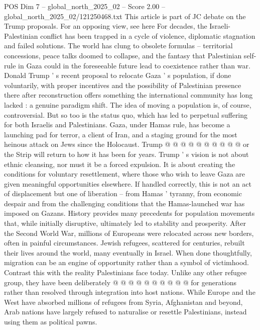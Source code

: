 \begin{textsample}{POS Dim 7 – global\_north\_2025\_02 – Score 2.00 – global\_north\_2025\_02/121250468.txt}  \label{ex:f7_pos_385}
This article is part of JC debate on the Trump proposals.
For an opposing view, see here For decades, the Israeli-Palestinian conflict has been trapped in a cycle of violence, diplomatic stagnation and failed solutions.
The world has clung to obsolete formulas -- territorial concessions, peace talks doomed to collapse, and the fantasy that Palestinian self-rule in Gaza could in the foreseeable future lead to coexistence rather than war.
Donald Trump ' s recent proposal to relocate Gaza ' s population, if done voluntarily, with proper incentives and the possibility of Palestinian presence there after reconstruction offers something the international community has long lacked : a genuine paradigm shift.
The idea of moving a population is, of course, controversial.
But so too is the status quo, which has led to perpetual suffering for both Israelis and Palestinians.
Gaza, under Hamas rule, has become a launching pad for terror, a client of Iran, and a staging ground for the most heinous attack on Jews since the Holocaust.
Trump @ @ @ @ @ @ @ @ @ @ or the Strip will return to how it has been for years.
Trump ' s vision is not about ethnic cleansing, nor must it be a forced expulsion.
It is about creating the conditions for voluntary resettlement, where those who wish to leave Gaza are given meaningful opportunities elsewhere.
If handled correctly, this is not an act of displacement but one of liberation -- from Hamas ' tyranny, from economic despair and from the challenging conditions that the Hamas-launched war has imposed on Gazans.
History provides many precedents for population movements that, while initially disruptive, ultimately led to stability and prosperity.
After the Second World War, millions of Europeans were relocated across new borders, often in painful circumstances.
Jewish refugees, scattered for centuries, rebuilt their lives around the world, many eventually in Israel.
When done thoughtfully, migration can be an engine of opportunity rather than a symbol of victimhood.
Contrast this with the reality Palestinians face today.
Unlike any other refugee group, they have been deliberately @ @ @ @ @ @ @ @ @ @ for generations rather than resolved through integration into host nations.
While Europe and the West have absorbed millions of refugees from Syria, Afghanistan and beyond, Arab nations have largely refused to naturalise or resettle Palestinians, instead using them as political pawns.

\end{textsample}
